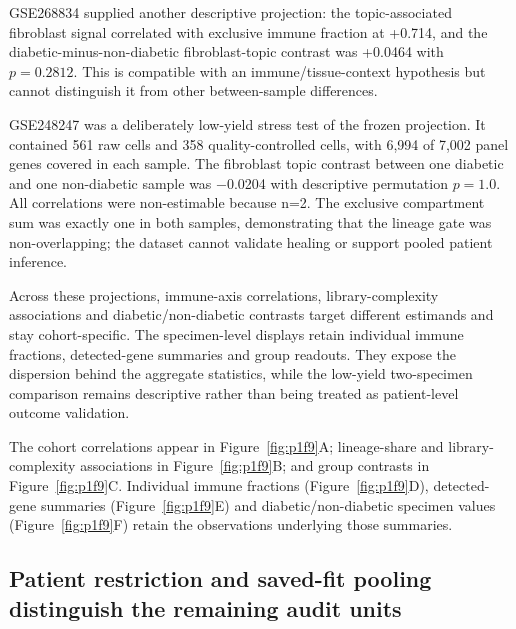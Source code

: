 GSE268834 supplied another descriptive projection: the topic-associated fibroblast signal correlated with exclusive immune fraction at +0.714, and the diabetic-minus-non-diabetic fibroblast-topic contrast was +0.0464 with $p=0.2812$. This is compatible with an immune/tissue-context hypothesis but cannot distinguish it from other between-sample differences.

GSE248247 was a deliberately low-yield stress test of the frozen projection. It contained 561 raw cells and 358 quality-controlled cells, with 6,994 of 7,002 panel genes covered in each sample. The fibroblast topic contrast between one diabetic and one non-diabetic sample was −0.0204 with descriptive permutation $p=1.0$. All correlations were non-estimable because n=2. The exclusive compartment sum was exactly one in both samples, demonstrating that the lineage gate was non-overlapping; the dataset cannot validate healing or support pooled patient inference.

Across these projections, immune-axis correlations, library-complexity associations and diabetic/non-diabetic contrasts target different estimands and stay cohort-specific. The specimen-level displays retain individual immune fractions, detected-gene summaries and group readouts. They expose the dispersion behind the aggregate statistics, while the low-yield two-specimen comparison remains descriptive rather than being treated as patient-level outcome validation.

The cohort correlations appear in Figure~\ref{fig:p1f9}A\label{call:p1f9}; lineage-share and library-complexity associations in Figure~\ref{fig:p1f9}B; and group contrasts in Figure~\ref{fig:p1f9}C. Individual immune fractions (Figure~\ref{fig:p1f9}D), detected-gene summaries (Figure~\ref{fig:p1f9}E) and diabetic/non-diabetic specimen values (Figure~\ref{fig:p1f9}F) retain the observations underlying those summaries.



\subsection{Patient restriction and saved-fit pooling distinguish the remaining audit units}

